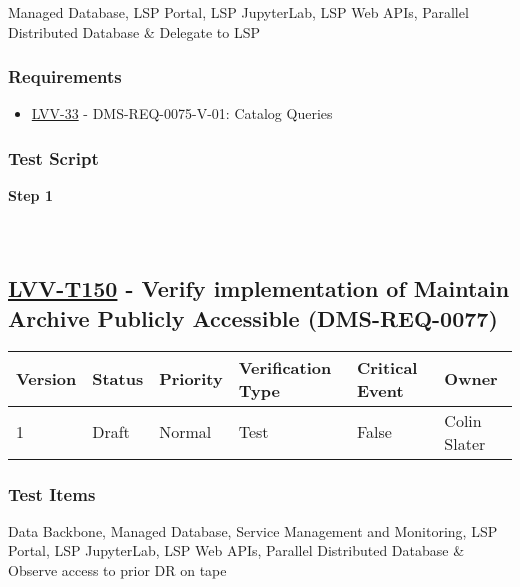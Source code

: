 Managed Database, LSP Portal, LSP JupyterLab, LSP Web APIs, Parallel
Distributed Database \& Delegate to LSP

\hypertarget{requirements-126}{%
\subsubsection{Requirements}\label{requirements-126}}

\begin{itemize}
\tightlist
\item
  \href{https://jira.lsstcorp.org/browse/LVV-33}{LVV-33} -
  DMS-REQ-0075-V-01: Catalog Queries
\end{itemize}

\hypertarget{test-script-126}{%
\subsubsection{Test Script}\label{test-script-126}}

\textbf{Step 1}\\
~\\
~\\

\hypertarget{lvv-t150---verify-implementation-of-maintain-archive-publicly-accessible-dms-req-0077}{%
\subsection{\texorpdfstring{\href{https://jira.lsstcorp.org/secure/Tests.jspa\#/testCase/LVV-T150}{LVV-T150}
- Verify implementation of Maintain Archive Publicly Accessible
(DMS-REQ-0077)}{LVV-T150 - Verify implementation of Maintain Archive Publicly Accessible (DMS-REQ-0077)}}\label{lvv-t150---verify-implementation-of-maintain-archive-publicly-accessible-dms-req-0077}}

\begin{longtable}[]{@{}llllll@{}}
\toprule
Version & Status & Priority & Verification Type & Critical Event &
Owner\tabularnewline
\midrule
\endhead
1 & Draft & Normal & Test & False & Colin Slater\tabularnewline
\bottomrule
\end{longtable}

\hypertarget{test-items-126}{%
\subsubsection{Test Items}\label{test-items-126}}

Data Backbone, Managed Database, Service Management and Monitoring, LSP
Portal, LSP JupyterLab, LSP Web APIs, Parallel Distributed Database \&
Observe access to prior DR on tape

